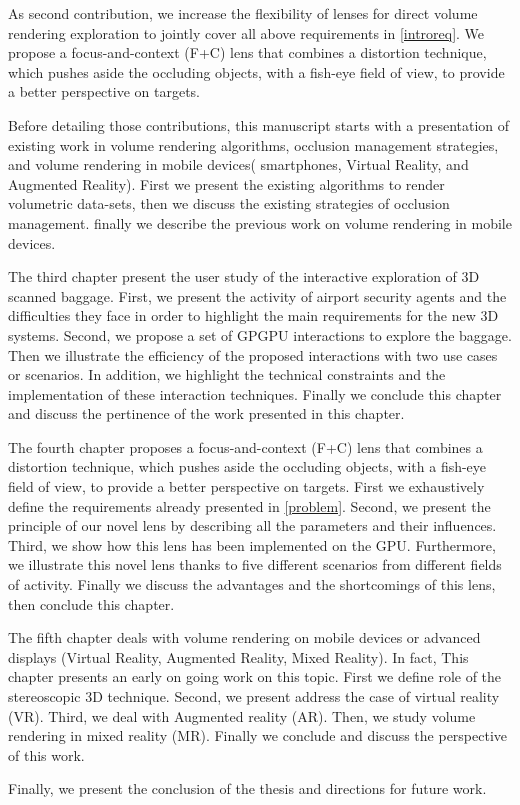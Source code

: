  As second contribution, we increase the flexibility of lenses for direct volume rendering exploration to jointly cover all above requirements in \autoref{introreq}. We propose a focus-and-context (F+C) lens that combines a distortion technique, which pushes aside the occluding objects, with a fish-eye field of view, to provide a better perspective on targets.
 

Before detailing those contributions, this manuscript starts with a presentation of existing work in volume rendering algorithms, occlusion management strategies, and volume rendering in mobile devices( smartphones, Virtual Reality, and Augmented Reality). First we present the existing algorithms to render volumetric data-sets, then we discuss the existing strategies of occlusion management. finally we  describe the previous work on  volume rendering in mobile devices.


The third chapter present the user study of the interactive exploration of 3D scanned baggage. First, we present the activity of airport security agents and the difficulties they face in order to highlight the main requirements for the new 3D systems. Second, we propose a set of GPGPU interactions to explore the baggage. Then we illustrate the efficiency of the proposed interactions with two use cases or scenarios.
In addition, we highlight the technical constraints and  the implementation of these interaction techniques. Finally we conclude this chapter and discuss the pertinence of the work presented in this chapter.


The fourth chapter  proposes a focus-and-context (F+C) lens that combines a distortion technique, which pushes aside the occluding objects, with a fish-eye field of view, to provide a better perspective on targets. First we exhaustively define  the requirements already  presented in \autoref{problem}. Second, we present the principle of our novel lens by describing all the   parameters and their influences. Third, we show how this lens has been implemented on the GPU. Furthermore, we illustrate this novel lens thanks  to five different scenarios from different fields of activity. Finally we discuss the advantages and the shortcomings of this lens, then conclude this chapter.  


The fifth chapter deals with volume rendering on mobile devices or advanced displays (Virtual Reality, Augmented Reality, Mixed Reality). In fact, This chapter presents an early on going work on this topic. First we define role of the stereoscopic 3D technique. Second, we present address the case of virtual reality (VR). Third, we deal with Augmented reality (AR). Then, we study volume rendering in mixed reality (MR). Finally we conclude and discuss the perspective of this work.


Finally, we present the conclusion of the thesis and directions for future work.


